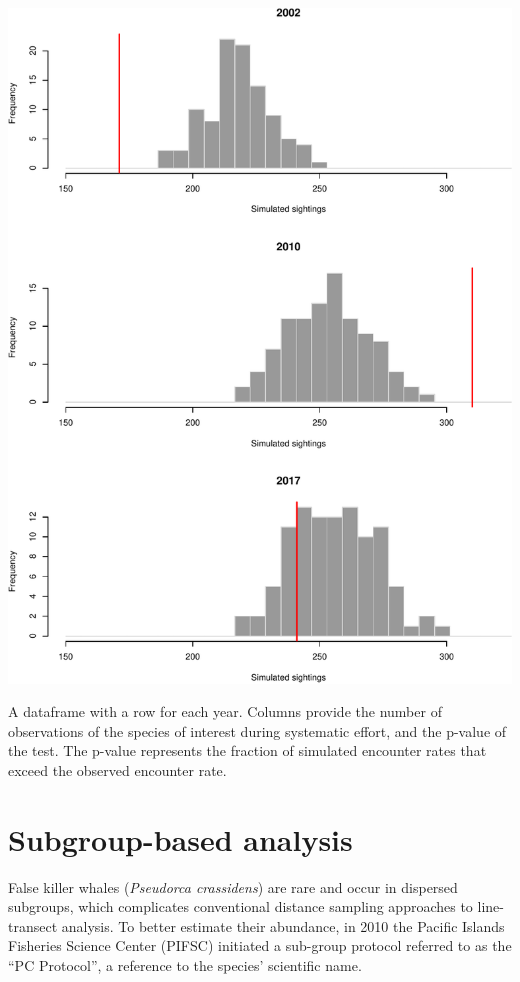 \documentclass[
]{book}
\begin{document}
\includegraphics{figures/unnamed-chunk-212-1.pdf}

A dataframe with a row for each year. Columns provide the number of observations of the species of interest during systematic effort, and the p-value of the test. The p-value represents the fraction of simulated encounter rates that exceed the observed encounter rate.

\hypertarget{subgroup-based-analysis}{%
\chapter{Subgroup-based analysis}\label{subgroup-based-analysis}}

False killer whales (\emph{Pseudorca crassidens}) are rare and occur in dispersed subgroups, which complicates conventional distance sampling approaches to line-transect analysis. To better estimate their abundance, in 2010 the Pacific Islands Fisheries Science Center (PIFSC) initiated a sub-group protocol referred to as the ``PC Protocol'', a reference to the species' scientific name.
\end{document}
